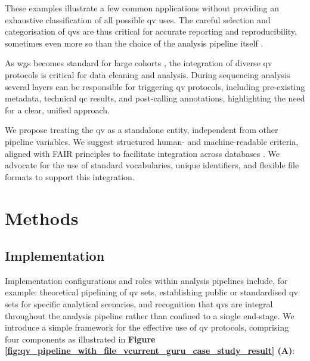  These examples illustrate a few common applications without providing an exhaustive classification of all possible \ac{qv} uses.
The careful selection and categorisation of \ac{qv}s are thus critical for accurate reporting and reproducibility, sometimes even more so than the choice of the analysis pipeline itself \cite{olson2023variant}.

As \ac{wgs} becomes standard for large cohorts \cite{lee2018gene, jansen2019genome}, the integration of diverse \ac{qv} protocols is critical for data cleaning and analysis. 
During sequencing analysis several layers can be responsible for triggering \ac{qv} protocols, including
pre-existing metadata, technical \ac{qc} results, and post-calling annotations,
highlighting the need for a clear, unified approach. 

We propose treating the \ac{qv} as a standalone entity, independent from other pipeline variables. We suggest structured human- and machine-readable criteria, aligned with FAIR principles \cite{wilkinson2016fair} to facilitate integration across databases \cite{van2023bridging, toure2023fairification}. We advocate for the use of standard vocabularies, unique identifiers, and flexible file formats to support this integration.

\section{Methods}
\subsection{Implementation} \label{sec:framework}

Implementation configurations and roles within analysis pipelines include, for example:
theoretical pipelining of \ac{qv} sets,
establishing public or standardised \ac{qv} sets for specific analytical scenarios, and 
recognition that \ac{qv}s are integral throughout the analysis pipeline rather than confined to a single end-stage.
We introduce a simple framework for the effective use of \ac{qv} protocols, comprising four components as illustrated in \textbf{Figure \ref{fig:qv_pipeline_with_file_vcurrent_guru_case_study_result} (A)}:


